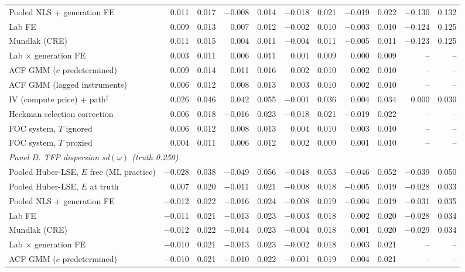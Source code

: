 \begin{table}[!htbp]
\begin{threeparttable}
\begin{tabular}{lrrrrrrrrrr}
Pooled NLS + generation FE & 0.011 & 0.017 & $-$0.008 & 0.014 & $-$0.018 & 0.021 & $-$0.019 & 0.022 & $-$0.130 & 0.132 \\
Lab FE & 0.009 & 0.013 & 0.007 & 0.012 & $-$0.002 & 0.010 & $-$0.003 & 0.010 & $-$0.124 & 0.125 \\
Mundlak (CRE) & 0.011 & 0.015 & 0.004 & 0.011 & $-$0.004 & 0.011 & $-$0.005 & 0.011 & $-$0.123 & 0.125 \\
Lab $\times$ generation FE & 0.003 & 0.011 & 0.006 & 0.011 & 0.001 & 0.009 & 0.000 & 0.009 & -- & -- \\
ACF GMM ($c$ predetermined) & 0.009 & 0.014 & 0.011 & 0.016 & 0.002 & 0.010 & 0.002 & 0.010 & -- & -- \\
ACF GMM (lagged instruments) & 0.006 & 0.012 & 0.008 & 0.013 & 0.003 & 0.010 & 0.002 & 0.010 & -- & -- \\
IV (compute price) + path$^{\ddagger}$ & 0.026 & 0.046 & 0.042 & 0.055 & $-$0.001 & 0.036 & 0.004 & 0.034 & 0.000 & 0.030 \\
Heckman selection correction & 0.006 & 0.018 & $-$0.016 & 0.023 & $-$0.018 & 0.021 & $-$0.019 & 0.022 & -- & -- \\
FOC system, $T$ ignored & 0.006 & 0.012 & 0.008 & 0.013 & 0.004 & 0.010 & 0.003 & 0.010 & -- & -- \\
FOC system, $T$ proxied & 0.004 & 0.011 & 0.006 & 0.012 & 0.002 & 0.009 & 0.001 & 0.010 & -- & -- \\
\midrule
\multicolumn{11}{l}{\textit{Panel D. TFP dispersion sd$(\omega)$ (truth 0.250)}} \\
Pooled Huber-LSE, $E$ free (ML practice) & $-$0.028 & 0.038 & $-$0.049 & 0.056 & $-$0.048 & 0.053 & $-$0.046 & 0.052 & $-$0.039 & 0.050 \\
Pooled Huber-LSE, $E$ at truth & 0.007 & 0.020 & $-$0.011 & 0.021 & $-$0.008 & 0.018 & $-$0.005 & 0.019 & $-$0.028 & 0.033 \\
Pooled NLS + generation FE & $-$0.012 & 0.022 & $-$0.016 & 0.024 & $-$0.008 & 0.019 & $-$0.004 & 0.019 & $-$0.031 & 0.035 \\
Lab FE & $-$0.011 & 0.021 & $-$0.013 & 0.023 & $-$0.003 & 0.018 & 0.002 & 0.020 & $-$0.028 & 0.034 \\
Mundlak (CRE) & $-$0.012 & 0.022 & $-$0.014 & 0.023 & $-$0.004 & 0.018 & 0.001 & 0.020 & $-$0.029 & 0.034 \\
Lab $\times$ generation FE & $-$0.010 & 0.021 & $-$0.013 & 0.023 & $-$0.002 & 0.018 & 0.003 & 0.021 & -- & -- \\
ACF GMM ($c$ predetermined) & $-$0.010 & 0.021 & $-$0.010 & 0.022 & $-$0.001 & 0.019 & 0.004 & 0.021 & -- & -- \\

\end{tabular}
\end{threeparttable}
\end{table}
